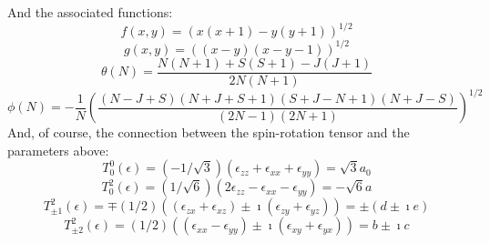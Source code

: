 \documentclass{article}
\begin{document}
And the associated functions:
\begin{equation}
f(x,y) = (x(x+1)-y(y+1))^{1/2}
\end{equation}
\begin{equation}
g(x,y) = ((x-y)(x-y-1))^{1/2}
\end{equation}
\begin{equation}
\theta(N) = \frac{N(N+1)+S(S+1)-J(J+1)}{2N(N+1)}
\end{equation}
\begin{equation}
\phi(N) =  -\frac{1}{N}\left( \frac{(N-J+S)(N+J+S+1)(S+J-N+1)(N+J-S)}{(2N-1)(2N+1)}\right)^{1/2}
\end{equation}
And, of course, the connection between the spin-rotation tensor and the parameters above:
\begin{equation}
T_{0}^{0}(\epsilon) = (-1/\sqrt{3})(\epsilon_{zz}+\epsilon_{xx}+\epsilon_{yy})=\sqrt{3}a_{0}
\end{equation}
\begin{equation}
T_{0}^{2}(\epsilon) = (1/\sqrt{6})(2\epsilon_{zz}-\epsilon_{xx}-\epsilon_{yy})=-\sqrt{6}a
\end{equation}
\begin{equation}
T_{\pm1}^{2}(\epsilon) = \mp(1/2)((\epsilon_{zx}+\epsilon_{xz})\pm\imath(\epsilon_{zy}+\epsilon_{yz})) = \pm(d\pm\imath e)
\end{equation}
\begin{equation}
T_{\pm2}^{2}(\epsilon) = (1/2)((\epsilon_{xx}-\epsilon_{yy})\pm\imath(\epsilon_{xy}+\epsilon_{yx})) = b \pm\imath c
\end{equation}
\end{document}
